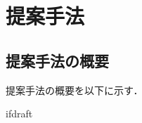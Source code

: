 \documentclass{jsarticle}
\begin{document}
    \fi
    \section{提案手法}

    \subsection{提案手法の概要}

    提案手法の概要を以下に示す．









    \expandafter\ifx\csname ifdraft\endcsname\relax
\end{document}
